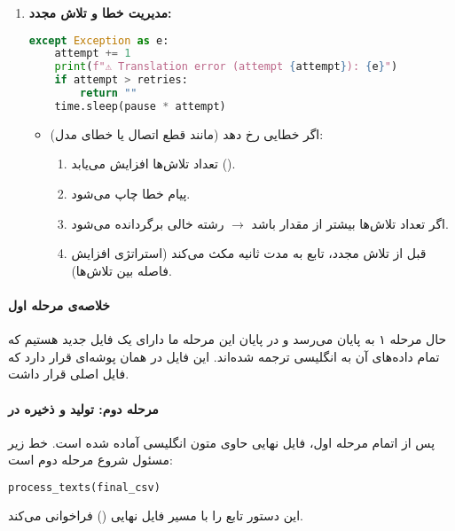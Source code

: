 \documentclass{article}
\begin{document}
\begin{enumerate}
    \item \textbf{مدیریت خطا و تلاش مجدد:}
    \begin{latin}
    \begin{lstlisting}[language=Python]
except Exception as e:
    attempt += 1
    print(f"⚠️ Translation error (attempt {attempt}): {e}")
    if attempt > retries:
        return ""
    time.sleep(pause * attempt)
    \end{lstlisting}
    \end{latin}
    \begin{itemize}
        \item اگر خطایی رخ دهد (مانند قطع اتصال  یا خطای مدل):
        \begin{enumerate}
            \item تعداد تلاش‌ها افزایش می‌یابد ().
            \item پیام خطا چاپ می‌شود.
            \item اگر تعداد تلاش‌ها بیشتر از مقدار  باشد $\to$ رشته خالی برگردانده می‌شود.
            \item قبل از تلاش مجدد، تابع به مدت  ثانیه مکث می‌کند (استراتژی افزایش فاصله بین تلاش‌ها).
        \end{enumerate}
    \end{itemize}
\end{enumerate}

\paragraph{خلاصه‌ی مرحله اول}

حال مرحله ۱ به پایان می‌رسد و در پایان این مرحله ما دارای یک فایل  جدید هستیم که تمام داده‌های آن به انگلیسی ترجمه شده‌اند. این فایل در همان پوشه‌ای قرار دارد که فایل  اصلی قرار داشت.


\paragraph{مرحله دوم: تولید  و ذخیره در }

پس از اتمام مرحله اول، فایل  نهایی حاوی متون انگلیسی آماده شده است. خط زیر مسئول شروع مرحله دوم است:

\begin{latin}
\begin{lstlisting}[language=Python]
process_texts(final_csv)
\end{lstlisting}
\end{latin}
این دستور تابع  را با مسیر فایل  نهایی () فراخوانی می‌کند.
\end{document}
